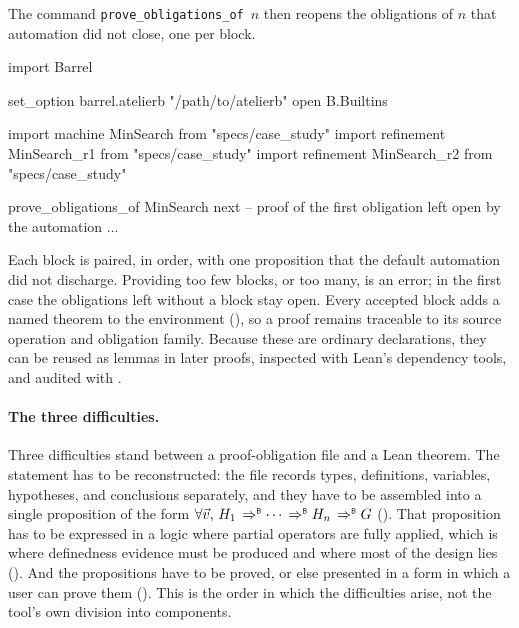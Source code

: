 The command \mbox{\texttt{prove\_obligations\_of} \(n\)} then reopens the obligations of \(n\)
that automation did not close, one per  block.

\begin{leanlisting}[title={Importing and proving a B refinement chain.},
    label={lst:barrel-workflow}, float=t]
import Barrel

set_option barrel.atelierb "/path/to/atelierb"
open B.Builtins

import machine    MinSearch    from "specs/case_study"
import refinement MinSearch_r1 from "specs/case_study"
import refinement MinSearch_r2 from "specs/case_study"

prove_obligations_of MinSearch
next
  -- proof of the first obligation left open by the automation
  ...
\end{leanlisting}

Each  block is paired, in order, with one proposition that the default
automation did not discharge.
Providing too few blocks, or too many, is an error; in the first case the obligations left
without a block stay open.
Every accepted block adds a named theorem to the environment
(), so a proof remains traceable to its source operation
and obligation family.
Because these are ordinary declarations, they can be reused as lemmas in later proofs,
inspected with Lean's dependency tools, and audited with .

\paragraph*{The three difficulties.}
Three difficulties stand between a proof-obligation file and a Lean theorem.
The statement has to be reconstructed: the file records types, definitions, variables,
hypotheses, and conclusions separately, and they have to be assembled into a single
proposition of the form \(\forall \vec{v},\, H_1 \impB \dots \impB H_n \impB G\)
().
That proposition has to be expressed in a logic where partial operators are fully applied,
which is where definedness evidence must be produced and where most of the design lies
().
And the propositions have to be proved, or else presented in a form in which a user can
prove them ().
This is the order in which the difficulties arise, not the tool's own division into
components.
